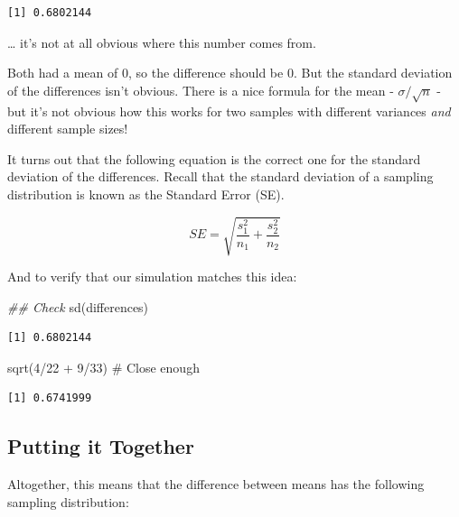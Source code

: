 \documentclass[
  letterpaper,
  DIV=11,
  numbers=noendperiod,
  oneside]{scrreprt}
\newenvironment{Shaded}{\begin{snugshade}}{\end{snugshade}}
\newcommand{\CommentTok}[1]{\textcolor[rgb]{0.37,0.37,0.37}{#1}}
\newcommand{\DecValTok}[1]{\textcolor[rgb]{0.68,0.00,0.00}{#1}}
\newcommand{\DocumentationTok}[1]{\textcolor[rgb]{0.37,0.37,0.37}{\textit{#1}}}
\newcommand{\FunctionTok}[1]{\textcolor[rgb]{0.28,0.35,0.67}{#1}}
\newcommand{\NormalTok}[1]{\textcolor[rgb]{0.00,0.23,0.31}{#1}}
\newcommand{\SpecialCharTok}[1]{\textcolor[rgb]{0.37,0.37,0.37}{#1}}
\begin{document}
\begin{verbatim}
[1] 0.6802144
\end{verbatim}

\ldots{} it's not at all obvious where this number comes from.

Both had a mean of 0, so the difference should be 0. But the standard
deviation of the differences isn't obvious. There is a nice formula for
the mean - \(\sigma/\sqrt{n}\) - but it's not obvious how this works for
two samples with different variances \emph{and} different sample sizes!

It turns out that the following equation is the correct one for the
standard deviation of the differences. Recall that the standard
deviation of a sampling distribution is known as the Standard Error
(SE).

\[
SE = \sqrt{\frac{s_1^2}{n_1} + \frac{s_2^2}{n_2}}
\]

And to verify that our simulation matches this idea:

\begin{Shaded}
\begin{Highlighting}[]
\DocumentationTok{\#\# Check}
\FunctionTok{sd}\NormalTok{(differences)}
\end{Highlighting}
\end{Shaded}

\begin{verbatim}
[1] 0.6802144
\end{verbatim}

\begin{Shaded}
\begin{Highlighting}[]
\FunctionTok{sqrt}\NormalTok{(}\DecValTok{4}\SpecialCharTok{/}\DecValTok{22} \SpecialCharTok{+} \DecValTok{9}\SpecialCharTok{/}\DecValTok{33}\NormalTok{) }\CommentTok{\# Close enough}
\end{Highlighting}
\end{Shaded}

\begin{verbatim}
[1] 0.6741999
\end{verbatim}

\hypertarget{putting-it-together}{%
\subsection{Putting it Together}\label{putting-it-together}}

Altogether, this means that the difference between means has the
following sampling distribution:
\end{document}
